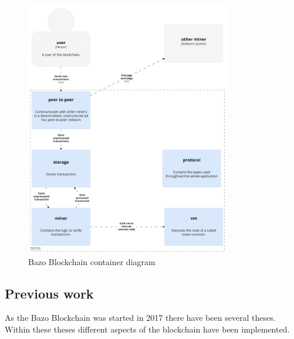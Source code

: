 \begin{figure}[H]
	\begin{center}
	\includegraphics[width=0.8\textwidth]{./images/BAZO_Container}
	\caption{Bazo Blockchain container diagram}
	\label{systemcontainerdiagram}
	\end{center}
\end{figure}
\pagebreak

\subsection{Previous work}
As the Bazo Blockchain was started in 2017 there have been several theses. Within these theses different aspects of the blockchain have been implemented. 

